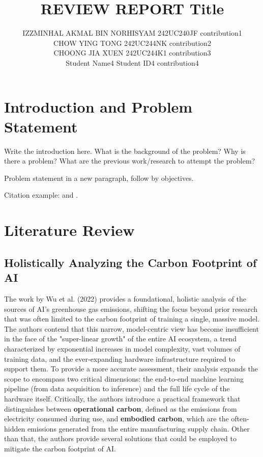 \documentclass[a4paper, 12pt]{article}
\author{
IZZMINHAL AKMAL BIN NORHISYAM \quad 242UC240JF \quad contribution1 \\
CHOW YING TONG \quad 242UC244NK \quad contribution2\\
CHOONG JIA XUEN \quad 242UC244K1 \quad contribution3\\
Student Name4 \quad Student ID4 \quad contribution4\\
}
\title{ REVIEW REPORT  Title  }
\begin{document}
\maketitle


\section{Introduction and Problem Statement}
Write the introduction here. What is the background of the problem? Why is there a problem? What are the previous work/research to attempt the problem? 

Problem statement in a new paragraph, follow by objectives.

Citation example: \cite{Termenchy15} and \cite{Jones19}.

\section{Literature Review}
\subsection{Holistically Analyzing the Carbon Footprint of AI}
\hspace{24pt}The work by Wu et al. (2022) provides a foundational, holistic analysis of the sources of AI's greenhouse gas emissions, shifting the focus beyond prior research that was often limited to the carbon footprint of training a single, massive model. The authors contend that this narrow, model-centric view has become insufficient in the face of the "super-linear growth" of the entire AI ecosystem, a trend characterized by exponential increases in model complexity, vast volumes of training data, and the ever-expanding hardware infrastructure required to support them. To provide a more accurate assessment, their analysis expands the scope to encompass two critical dimensions: the end-to-end machine learning pipeline (from data acquisition to inference) and the full life cycle of the hardware itself. Critically, the authors introduce a practical framework that distinguishes between \textbf{operational carbon}, defined as the emissions from electricity consumed during use, and \textbf{embodied carbon}, which are the often-hidden emissions generated from the entire manufacturing supply chain. Other than that, the authors provide several solutions that could be employed to mitigate the carbon footprint of AI.
\end{document}
